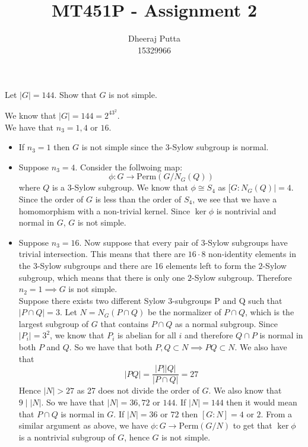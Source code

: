 \documentclass[12pt, answers]{exam}
\title{MT451P - Assignment 2}
\author{Dheeraj Putta \\ 15329966}
\date{}
\begin{document}
    \maketitle
    \begin{questions}
        \thispagestyle{foot}
        \question Let $|G| = 144$. Show that $G$ is not simple.
        \begin{solution}
            We know that $|G| = 144 = 2^43^2$.\\
            We have that $n_3 = 1, 4$ or $16$.
            \begin{itemize}
                \item If $n_3 = 1$ then $G$ is not simple since the $3$-Sylow subgroup is normal.
                \item Suppose $n_3 = 4$. Consider the follwoing map:
                \[ \phi\colon G \to \text{Perm}(G/N_G(Q)) \]
                where $Q$ is a $3$-Sylow subgroup. We know that $\phi \cong S_4$ as $[G: N_G(Q)| = 4$. Since the order of $G$ is less than the order of $S_4$, we see that we have a homomorphism with a non-trivial kernel. Since $\ker \phi$ is nontrivial and normal in $G$, $G$ is not simple.

                \item Suppose $n_3 = 16$. Now suppose that every pair of 3-Sylow subgroups have trivial intersection. This means that there are $16 \cdot 8$ non-identity elements in the $3$-Sylow subgroups and there are 16 elements left to form the $2$-Sylow subgroup, which means that there is only one $2$-Sylow subgroup. Therefore $n_2 = 1\implies G$ is not simple. \\

                Suppose there exists two different Sylow 3-subgroups P and Q such that $|P \cap Q| = 3$. Let $N = N_G(P \cap Q)$ be the normalizer of $P \cap Q$, which is the largest subgroup of $G$ that contains $P \cap Q$ as a normal subgroup. Since $|P_i| = 3^2$, we know that $P_i$ is abelian for all $i$ and therefore $Q \cap P$ is normal in both $P$ and $Q$. So we have that both $P, Q \subset N \implies PQ \subset N$. We also have that
                \[ |PQ| = \frac{|P||Q|}{|P \cap Q|} = 27 \]
                Hence $|N| > 27$ as 27 does not divide the order of $G$. We also know that $9 \mathrel{|} |N|$. So we have that $|N| = 36, 72$ or $144$. If $|N| = 144$ then it would mean that $P \cap Q$ is normal in $G$. If $|N| = 36$ or $72$ then $[G \colon N] = 4$ or $2$. From a similar argument as above, we have $\phi\colon G \to \text{Perm}(G/N)$ to get that $\ker\phi$ is a nontrivial subgroup of $G$, hence $G$ is not simple.
            \end{itemize}
        \end{solution}


\end{questions}
\end{document}
